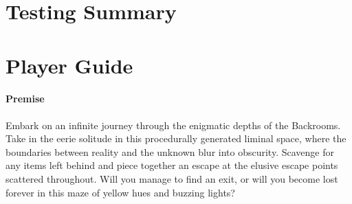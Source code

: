 \appendix
\chapter{Testing Summary}

\chapter{Player Guide}
\subsubsection{Premise}

Embark on an infinite journey through the enigmatic depths of the Backrooms. Take in the eerie solitude in this procedurally generated liminal space, where the boundaries between reality and the unknown blur into obscurity. Scavenge for any items left behind and piece together an escape at the elusive escape points scattered throughout. Will you manage to find an exit, or will you become lost forever in this maze of yellow hues and buzzing lights?




